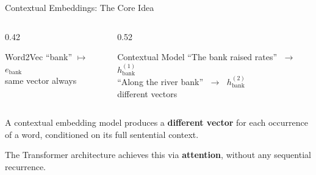 \documentclass[aspectratio=169]{beamer}
\begin{document}
%
%
\begin{frame}{Contextual Embeddings: The Core Idea}
  \begin{columns}[c]
    \begin{column}{0.42\textwidth}
      \vspace{-.75cm}
      \begin{block}{Word2Vec}
        \centering\vspace{0.3em}
        ``bank'' $\mapsto$ $e_{\text{bank}}$\\[0.5em]
        {\small same vector always}\vspace{0.3em}
      \end{block}
    \end{column}
    \begin{column}{0.52\textwidth}
      \begin{block}{Contextual Model}
        \centering\vspace{0.3em}
        ``The bank raised rates'' $\;\to\;$ $h^{(1)}_{\text{bank}}$\\[0.3em]
        ``Along the river bank'' $\;\to\;$ $h^{(2)}_{\text{bank}}$\\[0.5em]
        {\small different vectors}\vspace{0.3em}
      \end{block}
    \end{column}
  \end{columns}

  \vspace{1em}
  A contextual embedding model produces a \textbf{different vector} for each occurrence
  of a word, conditioned on its full sentential context.

  \vspace{0.5em}
  The Transformer architecture achieves this via \textbf{attention}, without any
  sequential recurrence.
\end{frame}
%
\end{document}
